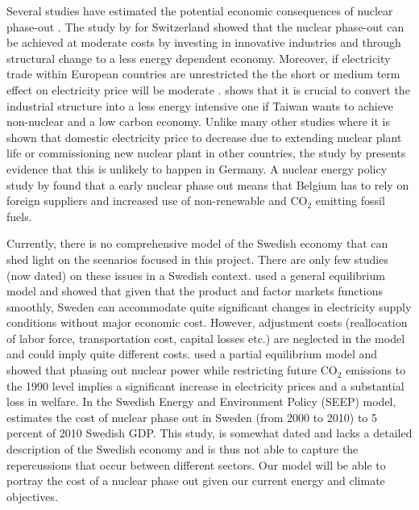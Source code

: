 Several studies have estimated the potential economic consequences of nuclear phase-out \citep{Bohringer2002, Nestle2012, Bretschger2012, Duscha0, Glomsrod2013, Kunsch2014}. The study by \cite{Bretschger2012} for Switzerland showed that the nuclear phase-out can be achieved at moderate costs by investing in innovative industries and through structural change to a less energy dependent economy. Moreover, if electricity trade within European countries are unrestricted the the short or medium term effect on electricity price will be moderate \citep{Glomsrod2013}. \cite{Chen2013} shows that it is crucial to convert the industrial structure into a less energy intensive one if Taiwan wants to achieve non-nuclear and a low carbon economy. Unlike many other studies where it is shown that domestic electricity price to decrease due to extending nuclear plant life or commissioning new nuclear plant in other countries, the study by \citep{Nestle2012} presents evidence that this is unlikely to happen in Germany. A nuclear energy policy study by \cite{Kunsch2014} found that a early nuclear phase out means that Belgium has to rely on foreign suppliers and increased use of non-renewable and CO$_2$ emitting fossil fuels.

Currently, there is no comprehensive model of the Swedish economy that can shed light on the scenarios focused in this project. There are only few studies (now dated) on these issues in a Swedish context. \cite{Bergman1981} used a general equilibrium model and showed that given that the product and factor markets functions smoothly, Sweden can accommodate quite significant changes in electricity supply conditions without major economic cost. However, adjustment costs (reallocation of labor force, transportation cost, capital losses etc.) are neglected in the model and could imply quite different costs. \cite{Andersson1997} used a partial equilibrium model and showed that phasing out nuclear power while restricting future CO$_2$ emissions to the 1990 level implies a significant increase in electricity prices and a substantial loss in welfare. In the Swedish Energy and Environment Policy (SEEP) model, \cite{nordhaus1997swedish} estimates the cost of nuclear phase out in Sweden (from 2000 to 2010) to 5 percent of 2010 Swedish GDP. This study, is somewhat dated and lacks a detailed description of the Swedish economy and is thus not able to capture the repercussions that occur between different sectors. Our model will be able to portray the cost of a nuclear phase out given our current energy and climate objectives.

